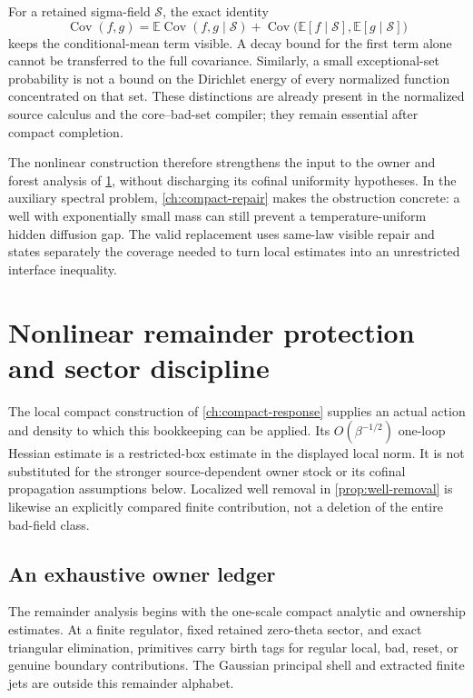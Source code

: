 \documentclass[11pt,oneside,openany]{book}
\theoremstyle{definition}
\theoremstyle{remark}
\newcommand{\E}{\mathbb E}
\newcommand{\Cov}{\operatorname{Cov}}
\newcommand{\src}[2]{\cite[#2]{#1}}
\begin{document}
For a retained sigma-field $\mathscr S$, the exact identity
\begin{equation}\label{eq:conditional-means-retained}
 \Cov(f,g)=\E\Cov(f,g\mid\mathscr S)
          +\Cov\bigl(\E[f\mid\mathscr S],\E[g\mid\mathscr S]\bigr)
\end{equation}
keeps the conditional-mean term visible. A decay bound for the first
term alone cannot be transferred to the full covariance. Similarly,
a small exceptional-set probability is not a bound on the Dirichlet
energy of every normalized function concentrated on that set.
These distinctions are already present in the normalized source
calculus and the core--bad-set compiler; they remain essential after
compact completion. \src{F12}{V19, V23--V26, V33}

The nonlinear construction therefore strengthens the input to the
owner and forest analysis of \cref{ch:remainder}, without discharging
its cofinal uniformity hypotheses. In the auxiliary spectral problem,
\cref{ch:compact-repair} makes the obstruction concrete: a well with
exponentially small mass can still prevent a temperature-uniform
hidden diffusion gap. The valid replacement uses same-law visible
repair and states separately the coverage needed to turn local
estimates into an unrestricted interface inequality.

\chapter{Nonlinear remainder protection and sector discipline}
\label{ch:remainder}
The local compact construction of \cref{ch:compact-response} supplies
an actual action and density to which this bookkeeping can be applied.
Its $O(\beta^{-1/2})$ one-loop Hessian estimate is a restricted-box
estimate in the displayed local norm. It is not substituted for the
stronger source-dependent owner stock or its cofinal propagation
assumptions below. Localized well removal in \cref{prop:well-removal}
is likewise an explicitly compared finite contribution, not a deletion
of the entire bad-field class.

\section{An exhaustive owner ledger}
The remainder analysis begins with the one-scale compact analytic and ownership estimates. At a finite regulator, fixed retained zero-theta sector, and exact triangular elimination, primitives carry birth tags for regular local, bad, reset, or genuine boundary contributions. The Gaussian principal shell and extracted finite jets are outside this remainder alphabet.
\end{document}
